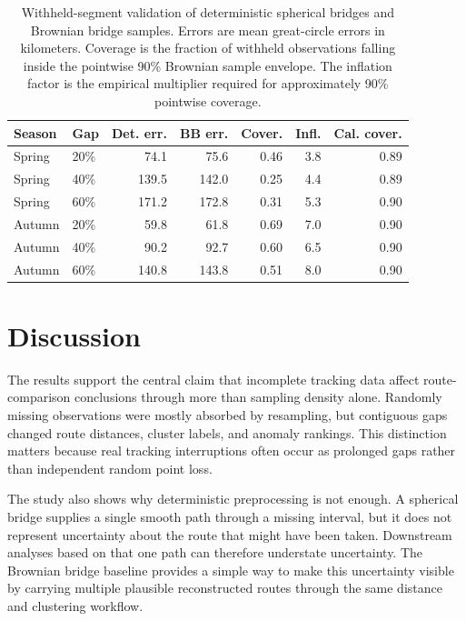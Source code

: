 \begin{table}[H]
\centering
\caption{Withheld-segment validation of deterministic spherical bridges and Brownian bridge samples. Errors are mean great-circle errors in kilometers. Coverage is the fraction of withheld observations falling inside the pointwise 90\% Brownian sample envelope. The inflation factor is the empirical multiplier required for approximately 90\% pointwise coverage.}
\label{tab:withheld-validation}
\small
\begin{tabular}{llrrrrr}
\toprule
Season & Gap & Det. err. & BB err. & Cover. & Infl. & Cal. cover. \\
\midrule
Spring & 20\% & 74.1 & 75.6 & 0.46 & 3.8 & 0.89 \\
Spring & 40\% & 139.5 & 142.0 & 0.25 & 4.4 & 0.89 \\
Spring & 60\% & 171.2 & 172.8 & 0.31 & 5.3 & 0.90 \\
Autumn & 20\% & 59.8 & 61.8 & 0.69 & 7.0 & 0.90 \\
Autumn & 40\% & 90.2 & 92.7 & 0.60 & 6.5 & 0.90 \\
Autumn & 60\% & 140.8 & 143.8 & 0.51 & 8.0 & 0.90 \\
\bottomrule
\end{tabular}
\end{table}

\section{Discussion}\label{discussion}

The results support the central claim that incomplete tracking data affect route-comparison conclusions through more than sampling density alone. Randomly missing observations were mostly absorbed by resampling, but contiguous gaps changed route distances, cluster labels, and anomaly rankings. This distinction matters because real tracking interruptions often occur as prolonged gaps rather than independent random point loss.

The study also shows why deterministic preprocessing is not enough. A spherical bridge supplies a single smooth path through a missing interval, but it does not represent uncertainty about the route that might have been taken. Downstream analyses based on that one path can therefore understate uncertainty. The Brownian bridge baseline provides a simple way to make this uncertainty visible by carrying multiple plausible reconstructed routes through the same distance and clustering workflow.

